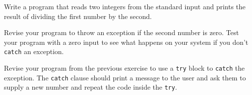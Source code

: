 %
%
\begin{question}
Write a program that reads two integers from the standard
input and prints the result of dividing the first number by the second.
\end{question}

\begin{question}
Revise your program to throw an exception if the second
number is zero. Test your program with a zero input to see what happens on
your system if you don’t \verb|catch| an exception.
\end{question}

\begin{question}
Revise your program from the previous exercise to use a
\verb|try| block to \verb|catch| the exception. The \verb|catch| clause should print a message
to the user and ask them to supply a new number and repeat the code inside
the \verb|try|.
\end{question}
